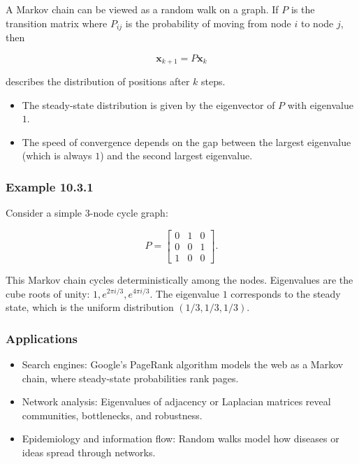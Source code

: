 \documentclass[
  12pt,
  a4paper,
]{article}
\begin{document}
A Markov chain can be viewed as a random walk on a graph. If \(P\) is
the transition matrix where \(P_{ij}\) is the probability of moving from
node \(i\) to node \(j\), then

\[\mathbf{x}_{k+1} = P \mathbf{x}_k\]

describes the distribution of positions after \(k\) steps.

\begin{itemize}
\item
  The steady-state distribution is given by the eigenvector of \(P\)
  with eigenvalue \(1\).
\item
  The speed of convergence depends on the gap between the largest
  eigenvalue (which is always \(1\)) and the second largest eigenvalue.
\end{itemize}

\subsubsection{Example 10.3.1}\label{example-1031}

Consider a simple 3-node cycle graph:

\[P = \begin{bmatrix}
0 & 1 & 0 \\
0 & 0 & 1 \\
1 & 0 & 0
\end{bmatrix}.\]

This Markov chain cycles deterministically among the nodes. Eigenvalues
are the cube roots of unity: \(1, e^{2\pi i/3}, e^{4\pi i/3}\). The
eigenvalue \(1\) corresponds to the steady state, which is the uniform
distribution \((1/3,1/3,1/3)\).

\subsubsection{Applications}\label{applications-3}

\begin{itemize}
\item
  Search engines: Google's PageRank algorithm models the web as a Markov
  chain, where steady-state probabilities rank pages.
\item
  Network analysis: Eigenvalues of adjacency or Laplacian matrices
  reveal communities, bottlenecks, and robustness.
\item
  Epidemiology and information flow: Random walks model how diseases or
  ideas spread through networks.
\end{itemize}
\end{document}
